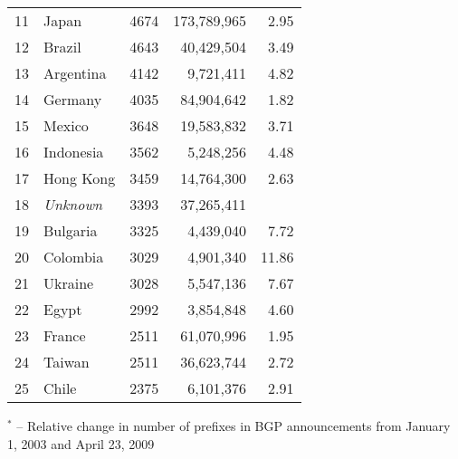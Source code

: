 \begin{table*}[tp]
\begin{minipage}[t]{0.48\textwidth}
\begin{center}
\begin{tabular}{|l||l|r|r|r|}
11      &       Japan   		&       4674    &       173,789,965     & 2.95			\tabularnewline %
12      &       Brazil  		&       4643    &       40,429,504      & 3.49			\tabularnewline %
13      &       Argentina       &       4142    &       9,721,411       & 4.82			\tabularnewline %
14      &       Germany 		&       4035    &       84,904,642      & 1.82			\tabularnewline %
15      &       Mexico  		&       3648    &       19,583,832      & 3.71			\tabularnewline %
16      &       Indonesia       &       3562    &       5,248,256       & 4.48			\tabularnewline %
17      &       Hong Kong       &       3459    &       14,764,300      & 2.63			\tabularnewline %
18      &       \emph{Unknown}	&       3393    &       37,265,411      & 				\tabularnewline %
19      &       Bulgaria        &       3325    &       4,439,040       & 7.72			\tabularnewline %
20      &       Colombia        &       3029    &       4,901,340       & 11.86			\tabularnewline %
21      &       Ukraine 		&       3028    &       5,547,136       & 7.67			\tabularnewline %
22      &       Egypt  			&       2992    &       3,854,848       & 4.60			\tabularnewline %
23      &       France 			&       2511    &       61,070,996      & 1.95			\tabularnewline %
24      &       Taiwan 			&       2511    &       36,623,744      & 2.72			\tabularnewline %
25      &       Chile  			&       2375    &       6,101,376       & 2.91			\tabularnewline %
	\hline
	\end{tabular}
	\end{center}
	
	\small	$^{*}$ -- Relative change in number of prefixes in BGP announcements from January 1, 2003 and April 23, 2009
\end{minipage}

\vspace{1cm}


\end{table*}
